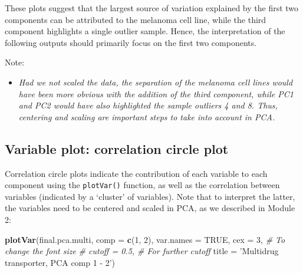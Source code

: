 \documentclass[]{book}
\newenvironment{Shaded}{\begin{snugshade}}{\end{snugshade}}
\newcommand{\CommentTok}[1]{\textcolor[rgb]{0.56,0.35,0.01}{\textit{#1}}}
\newcommand{\DataTypeTok}[1]{\textcolor[rgb]{0.13,0.29,0.53}{#1}}
\newcommand{\DecValTok}[1]{\textcolor[rgb]{0.00,0.00,0.81}{#1}}
\newcommand{\KeywordTok}[1]{\textcolor[rgb]{0.13,0.29,0.53}{\textbf{#1}}}
\newcommand{\NormalTok}[1]{#1}
\newcommand{\OtherTok}[1]{\textcolor[rgb]{0.56,0.35,0.01}{#1}}
\newcommand{\StringTok}[1]{\textcolor[rgb]{0.31,0.60,0.02}{#1}}
\providecommand{\tightlist}{%
  \setlength{\itemsep}{0pt}\setlength{\parskip}{0pt}}
\begin{document}
These plots suggest that the largest source of variation explained by the first two components can be attributed to the melanoma cell line, while the third component highlights a single outlier sample. Hence, the interpretation of the following outputs should primarily focus on the first two components.

Note:

\begin{itemize}
\tightlist
\item
  \emph{Had we not scaled the data, the separation of the melanoma cell lines would have been more obvious with the addition of the third component, while PC1 and PC2 would have also highlighted the sample outliers 4 and 8. Thus, centering and scaling are important steps to take into account in PCA.}
\end{itemize}

\hypertarget{variable-plot-correlation-circle-plot}{%
\subsection{Variable plot: correlation circle plot}\label{variable-plot-correlation-circle-plot}}

Correlation circle plots indicate the contribution of each variable to each component using the \texttt{plotVar()} function, as well as the correlation between variables (indicated by a `cluster' of variables). Note that to interpret the latter, the variables need to be centered and scaled in PCA, as we described in Module 2:

\begin{Shaded}
\begin{Highlighting}[]
\KeywordTok{plotVar}\NormalTok{(final.pca.multi, }\DataTypeTok{comp =} \KeywordTok{c}\NormalTok{(}\DecValTok{1}\NormalTok{, }\DecValTok{2}\NormalTok{),}
        \DataTypeTok{var.names =} \OtherTok{TRUE}\NormalTok{,}
        \DataTypeTok{cex =} \DecValTok{3}\NormalTok{,         }\CommentTok{# To change the font size}
        \CommentTok{# cutoff = 0.5,  # For further cutoff}
        \DataTypeTok{title =} \StringTok{'Multidrug transporter, PCA comp 1 - 2'}\NormalTok{)}
\end{Highlighting}
\end{Shaded}
\end{document}
